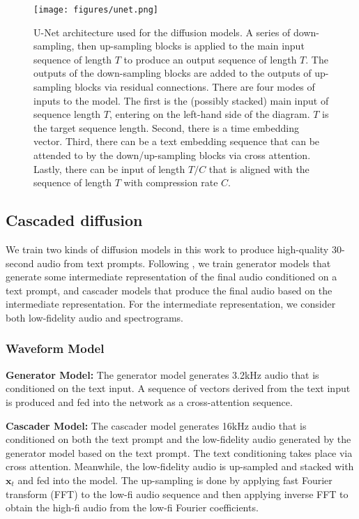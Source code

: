 \documentclass[nohyperref]{article}
\theoremstyle{plain}
\theoremstyle{definition}
\theoremstyle{remark}
\begin{document}
\begin{figure*}[ht]
\vskip 0.05in
\begin{center}
\centerline{\texttt{[image: figures/unet.png]}}
\vskip -0.05in
\caption{U-Net architecture used for the diffusion models. A series of down-sampling, then up-sampling blocks is applied to the main input sequence of length $T$ to produce an output sequence of length $T$. The outputs of the down-sampling blocks are added to the outputs of up-sampling blocks via residual connections. There are four modes of inputs to the model. The first is the (possibly stacked) main input of sequence length $T$, entering on the left-hand side of the diagram. $T$ is the target sequence length. Second, there is a time embedding vector. Third, there can be a text embedding sequence that can be attended to by the down/up-sampling blocks via cross attention. Lastly, there can be input of length $T/C$ that is aligned with the sequence of length $T$ with compression rate $C$.}
\label{U-Net}
\end{center}
\vskip -0.25in
\end{figure*}


\subsection{Cascaded diffusion}

We train two kinds of diffusion models in this work to produce high-quality 30-second audio from text prompts. Following \cite{ho2022cascaded}, we train generator models that generate some intermediate representation of the final audio conditioned on a text prompt, and cascader models that produce the final audio based on the intermediate representation. For the intermediate representation, we consider both low-fidelity audio and spectrograms.

\subsubsection{Waveform Model}

\textbf{Generator Model:} The generator model generates 3.2kHz audio that is conditioned on the text input. A sequence of vectors derived from the text input is produced and fed into the network as a cross-attention sequence.

\textbf{Cascader Model:} The cascader model generates 16kHz audio that is conditioned on both the text prompt and the low-fidelity audio generated by the generator model based on the text prompt. The text conditioning takes place via cross attention. Meanwhile, the low-fidelity audio is up-sampled and stacked with $\mathbf{x}_t$ and fed into the model. The up-sampling is done by applying fast Fourier transform (FFT) to the low-fi audio sequence and then applying inverse FFT to obtain the high-fi audio from the low-fi Fourier coefficients.
\end{document}
